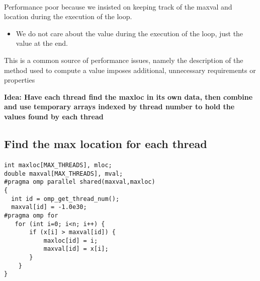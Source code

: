 \documentclass[%
oneside,                 %
final,                   %
10pt]{article}
\begin{document}
\paragraph{}
Performance poor because we insisted on keeping track of the maxval and location during the execution of the loop.
\begin{itemize}
 \item We do not care about the value during the execution of the loop, just the value at the end.
\end{itemize}

\noindent
This is a common source of performance issues, namely the description of the method used to compute a value imposes additional, unnecessary requirements or properties

\textbf{Idea: Have each thread find the maxloc in its own data, then combine and use temporary arrays indexed by thread number to hold the values found by each thread}



\subsection*{Find the max location for each thread}

\paragraph{}















\begin{verbatim}
int maxloc[MAX_THREADS], mloc;
double maxval[MAX_THREADS], mval; 
#pragma omp parallel shared(maxval,maxloc)
{
  int id = omp_get_thread_num(); 
  maxval[id] = -1.0e30;
#pragma omp for
   for (int i=0; i<n; i++) {
       if (x[i] > maxval[id]) { 
           maxloc[id] = i;
           maxval[id] = x[i]; 
       }
    }
}

\end{verbatim}
\end{document}
